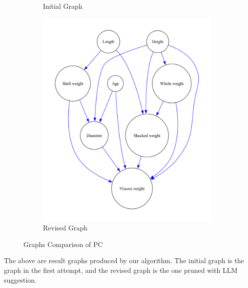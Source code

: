\documentclass{article}
\begin{document}
\begin{figure}[H]
\begin{subfigure}{0.3\textwidth}
        \vfill
        \caption{Initial Graph}
        \label{fig:sub2}
    \end{subfigure}
    \hspace{0.04\textwidth}
    \begin{subfigure}{0.3\textwidth}
        \centering
        \vspace{-0.5cm}
        \includegraphics[width=\linewidth]{data/dataset/Abalone/output_graph/revised_graph.pdf}
        \vfill
        \caption{Revised Graph}
        \label{fig:sub3}
    \end{subfigure}
    \caption{Graphs Comparison of PC}
    \label{fig:main}
\end{figure}

The above are result graphs produced by our algorithm.
The initial graph is the graph in the first attempt, and the revised graph is the one pruned with LLM suggestion.
\end{document}
